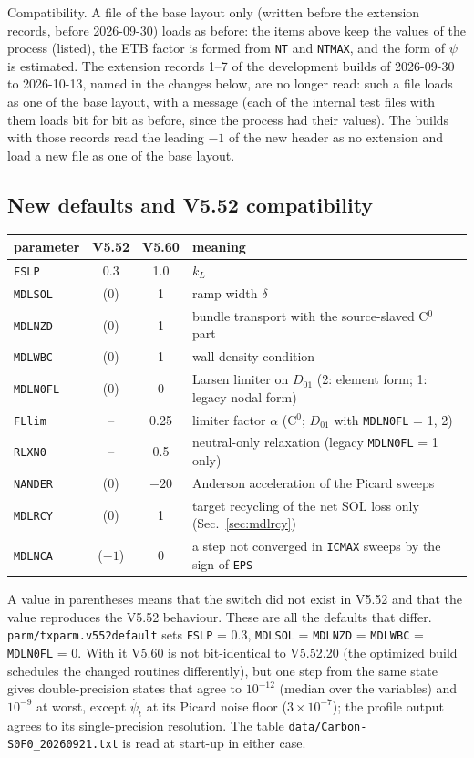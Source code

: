 \documentclass[11pt]{article}
\def\psit{\psi_t}
\def\psitd{\dot{\psit}}
\begin{document}
Compatibility.  A file of the base layout only (written before the extension records, before
2026-09-30) loads as before: the items above keep the values of the process (listed), the ETB
factor is formed from \texttt{NT} and \texttt{NTMAX}, and the form of $\psi$ is estimated.  The
extension records 1--7 of the development builds of 2026-09-30 to 2026-10-13, named in the
changes below, are no longer read: such a file loads as one of the base layout, with a message
(each of the internal test files with them loads bit for bit as before, since the process had
their values).  The builds with those records read the leading $-1$ of the new header as no
extension and load a new file as one of the base layout.

\subsection{New defaults and V5.52 compatibility}

\begin{center}
\begin{tabular}{|l|c|c|l|}\hline
parameter & V5.52 & V5.60 & meaning \\\hline
\texttt{FSLP}    & 0.3 & 1.0 & $k_L$ \\
\texttt{MDLSOL}  & (0) & 1   & ramp width $\delta$ \\
\texttt{MDLNZD}  & (0) & 1   & bundle transport with the source-slaved C$^0$ part \\
\texttt{MDLWBC}  & (0) & 1   & wall density condition \\
\texttt{MDLN0FL} & (0) & 0   & Larsen limiter on $D_{01}$ (2: element form; 1: legacy nodal form) \\
\texttt{FLlim}   & --  & 0.25 & limiter factor $\alpha$ (C$^0$; $D_{01}$ with \texttt{MDLN0FL} = 1, 2) \\
\texttt{RLXN0}   & --  & 0.5 & neutral-only relaxation (legacy \texttt{MDLN0FL} = 1 only) \\
\texttt{NANDER}  & (0) & $-20$ & Anderson acceleration of the Picard sweeps \\
\texttt{MDLRCY}  & (0) & 1 & target recycling of the net SOL loss only (Sec.~\ref{sec:mdlrcy}) \\
\texttt{MDLNCA}  & ($-1$) & 0 & a step not converged in \texttt{ICMAX} sweeps by the sign of \texttt{EPS} \\\hline
\end{tabular}
\end{center}

A value in parentheses means that the switch did not exist in V5.52 and that
the value reproduces the V5.52 behaviour.  These are all the defaults that differ.
\texttt{parm/txparm.v552default} sets
\texttt{FSLP} = 0.3, \texttt{MDLSOL} = \texttt{MDLNZD} = \texttt{MDLWBC} =
\texttt{MDLN0FL} = 0.  With it V5.60 is not bit-identical to V5.52.20 (the
optimized build schedules the changed routines differently), but one step from
the same state gives double-precision states that agree to $10^{-12}$ (median
over the variables) and $10^{-9}$ at worst, except $\psitd$ at its Picard noise
floor ($3\times10^{-7}$); the profile output agrees to its single-precision
resolution.  The table \texttt{data/Carbon-S0F0\_20260921.txt} is read at start-up in
either case.
\end{document}
